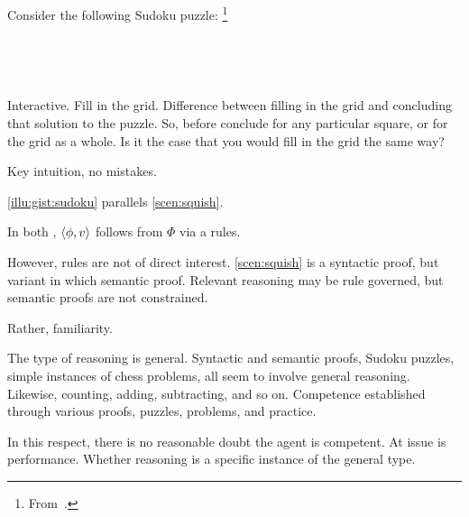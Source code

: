 \begin{note}
  \begin{illustration}[Sudoku]
    \label{illu:gist:sudoku}
    Consider the following Sudoku puzzle:%
    \footnote{
      From~\textcite[84]{Coussement:2007up}.
    }
    \vspace{\baselineskip}

    \mbox{ }\hfill%
    \begin{adjustbox}{minipage=0.45\linewidth,scale=1}
      \centering
    \end{adjustbox}%
    \hfill\mbox{ }

  \end{illustration}

  Interactive.
  Fill in the grid.
  Difference between filling in the grid and concluding that solution to the puzzle.
  So, before conclude for any particular square, or for the grid as a whole.
  Is it the case that you would fill in the grid the same way?

  Key intuition, no mistakes.
\end{note}

\begin{note}
  \autoref{illu:gist:sudoku} parallels \autoref{scen:squish}.

  In both , \(\langle \phi, v \rangle\) follows from \(\Phi\) via a rules.

  However, rules are not of direct interest.
  \autoref{scen:squish} is a syntactic proof, but variant  in which semantic proof.
  Relevant reasoning may be rule governed, but semantic proofs are not constrained.

  Rather, familiarity.

  The type of reasoning is general.
  Syntactic and semantic proofs, Sudoku puzzles, simple instances of chess problems, all seem to involve general reasoning.
  Likewise, counting, adding, subtracting, and so on.
  Competence established through various proofs, puzzles, problems, and practice.

  In this respect, there is no reasonable doubt the agent is competent.
  At issue is performance.
  Whether reasoning is a specific instance of the general type.
\end{note}


